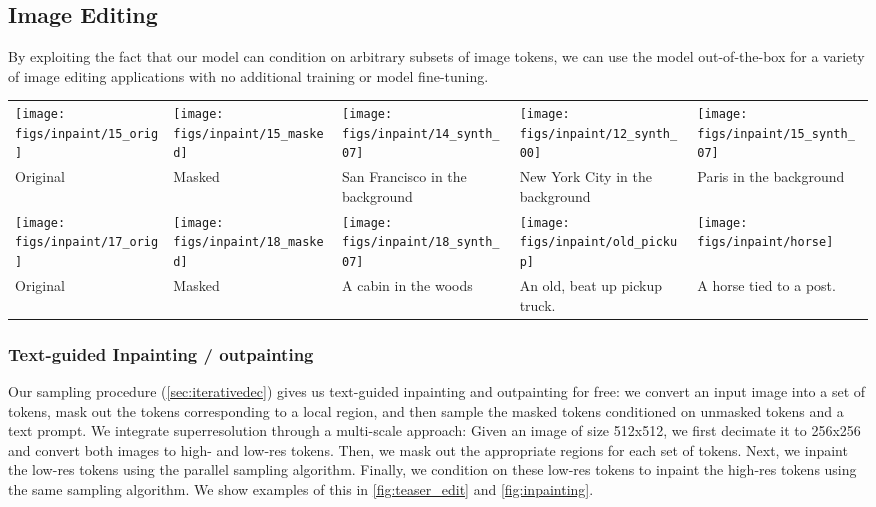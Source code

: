 \subsection{Image Editing}
\label{sec:editing}
By exploiting the fact that our model can condition on arbitrary subsets of image tokens, we can use the model out-of-the-box for a variety of image editing applications with no additional training or model fine-tuning.
\begin{figure*}
  \centering
  \begin{tabular}{p{27mm}p{27mm}p{27mm}p{27mm}p{27mm}}
    \texttt{[image: figs/inpaint/15\_orig]} &
    \texttt{[image: figs/inpaint/15\_masked]} &
    \texttt{[image: figs/inpaint/14\_synth\_07]} &
    \texttt{[image: figs/inpaint/12\_synth\_00]} &
    \texttt{[image: figs/inpaint/15\_synth\_07]} 
    \\
     Original &
     Masked &
    {San Francisco in the background} & 
    {New York City in the background} &
    {Paris in the background} 
    \\
    \texttt{[image: figs/inpaint/17\_orig]} &
    \texttt{[image: figs/inpaint/18\_masked]} &
    \texttt{[image: figs/inpaint/18\_synth\_07]} &
    \texttt{[image: figs/inpaint/old\_pickup]} &
    \texttt{[image: figs/inpaint/horse]} 
    \\
    Original &
    Masked &
    {A cabin in the woods} & 
    {An old, beat up pickup truck.} & 
    {A horse tied to a post.} 
  \end{tabular}
  \caption{\small Examples of text-guided inpainting. The mask is shown in the second column of each row. This behavior arises directly from the model with no fine-tuning.}
\label{fig:inpainting}
\end{figure*} \subsubsection{Text-guided Inpainting / outpainting}
Our sampling procedure (\cref{sec:iterativedec}) gives us text-guided inpainting and outpainting for free: we convert an input image into a set of tokens, mask out the tokens corresponding to a local region, and then sample the masked tokens conditioned on unmasked tokens and a text prompt. We integrate superresolution through a multi-scale approach: Given an image of size 512x512, we first decimate it to 256x256 and convert both images to high- and low-res tokens. Then, we mask out the appropriate regions for each set of tokens. Next, we inpaint the low-res tokens using the parallel sampling algorithm. Finally, we condition on these low-res tokens to inpaint the high-res tokens using the same sampling algorithm. We show examples of this in \cref{fig:teaser_edit} and \cref{fig:inpainting}.

